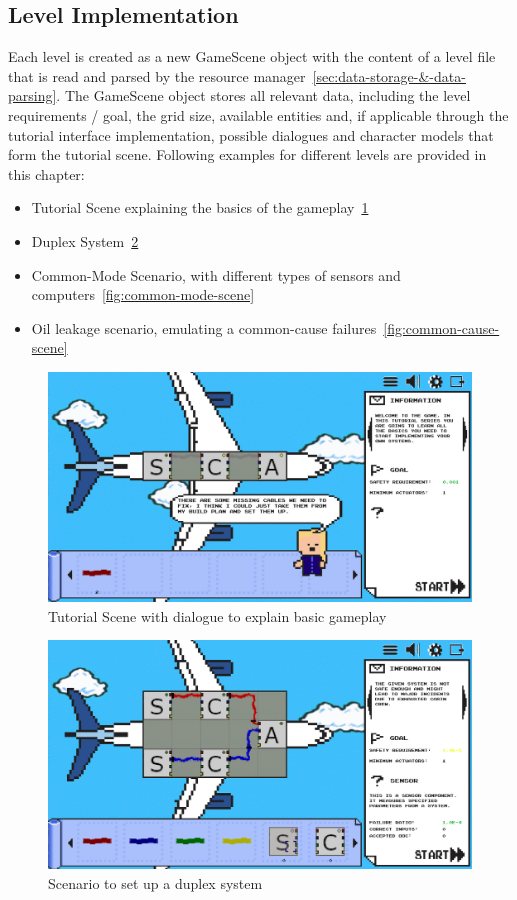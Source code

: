 \subsection{Level Implementation}\label{subsec:level-implementation}
Each level is created as a new GameScene object with the content of a level file that is read and parsed by the resource
manager~\ref{sec:data-storage-&-data-parsing}.
The GameScene object stores all relevant data, including the level requirements / goal, the grid size, available entities and, if applicable through the
tutorial interface implementation, possible dialogues and character models that form the tutorial scene.
Following examples for different levels are provided in this chapter:
\begin{itemize}
    \item Tutorial Scene explaining the basics of the gameplay~\ref{fig:basic-gameplay-tutorial}
    \item Duplex System~\ref{fig:duplex-system}
    \item Common-Mode Scenario, with different types of sensors and computers~\ref{fig:common-mode-scene}
    \item Oil leakage scenario, emulating a common-cause failures~\ref{fig:common-cause-scene}
\end{itemize}
\begin{figure}
    \centering
    \includegraphics[width=\textwidth]{Pictures/res/implementation/scenes/tutorial-game-scene}
    \caption{Tutorial Scene with dialogue to explain basic gameplay}
    \label{fig:basic-gameplay-tutorial}
\end{figure}
\begin{figure}
    \centering
    \includegraphics[width=\textwidth]{Pictures/res/implementation/scenes/duplex-scene}
    \caption{Scenario to set up a duplex system}
    \label{fig:duplex-system}
\end{figure}
